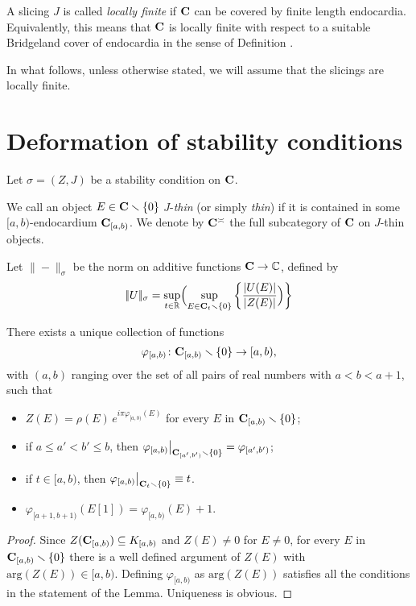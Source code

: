 \begin{definition}
A slicing $J$ is called \emph{locally finite} if $\mathbf{C}$ can be covered by finite length endocardia. Equivalently, this means that $\mathbf{C}$ is locally finite with respect to a suitable Bridgeland cover of endocardia in the sense of Definition .
\end{definition}

In what follows, unless otherwise stated, we will assume that the slicings are locally finite.

\section{Deformation of stability conditions}
Let $\sigma=(Z,J)$ be a stability condition on $\mathbf{C}$.
\begin{notat}\label{thinness}
We call an object $E\in \mathbf{C}\smallsetminus \{0\}$ $J$-\emph{thin} (or simply \emph{thin}) if it is contained in some $[a,b)$\hyp{}endocardium $\mathbf{C}_{[a,b)}$. We denote by  $\mathbf{C}^\asymp$ the full subcategory of  $\mathbf{C}$ on $J$\hyp{}thin objects.
\end{notat}
\begin{notat}Let $\|-\|_\sigma$ be the norm on additive functions $\mathbf{C}\to \mathbb C$, defined by
\[
|\!|U|\!|_\sigma=\underset{t\in \mathbb{R}}{\text{sup}}\Big(\underset{E\in \mathbf{C}_{t}\smallsetminus \{0\}}{\text{sup}} \left\{ \frac{|U(E)|}{|Z(E)|}\Big)
\right\}
\]
\end{notat}
\begin{lemma} There exists a unique collection of functions 
\[
\varphi_{[a,b)}\colon \mathbf{C}_{[a,b)}\smallsetminus \{0\} \to [a,b),
\]
with $(a,b)$ ranging over the set of all pairs of real numbers with $a<b<a+1$, such that
\begin{itemize}
\item $Z(E)=\rho(E)\, e^{i\pi \varphi_{[a,b)}(E)}$ for every $E$ in $\mathbf{C}_{[a,b)}\smallsetminus \{0\}$;
\item if $a\leq a'<b'\leq b$, then $\varphi_{[a,b)}\bigr\vert_{\mathbf{C}_{[a',b')}\smallsetminus \{0\}}=\varphi_{[a',b')}$;
\item if $t\in [a,b)$, then $\varphi_{[a,b)}\bigr\vert_{\mathbf{C}_{t}\smallsetminus \{0\}}\equiv t$.
\item $\varphi_{[a+1,b+1)}(E[1])=\varphi_{[a,b)}(E)+1$.
\end{itemize}
\end{lemma}
\begin{proof}
Since $Z(\mathbf{C}_{[a,b)})\subseteq K_{[a,b)}$ and $Z(E)\neq 0$ for $E\neq 0$, for every $E$ in $\mathbf{C}_{[a,b)}\smallsetminus \{0\}$  there is a well defined argument of $Z(E)$ with $\mathrm{arg}(Z(E))\in [a,b)$. Defining $\varphi_{[a,b)}$ as $\mathrm{arg}(Z(E))$ satisfies all the conditions in the statement of the Lemma. Uniqueness is obvious.
\end{proof}
